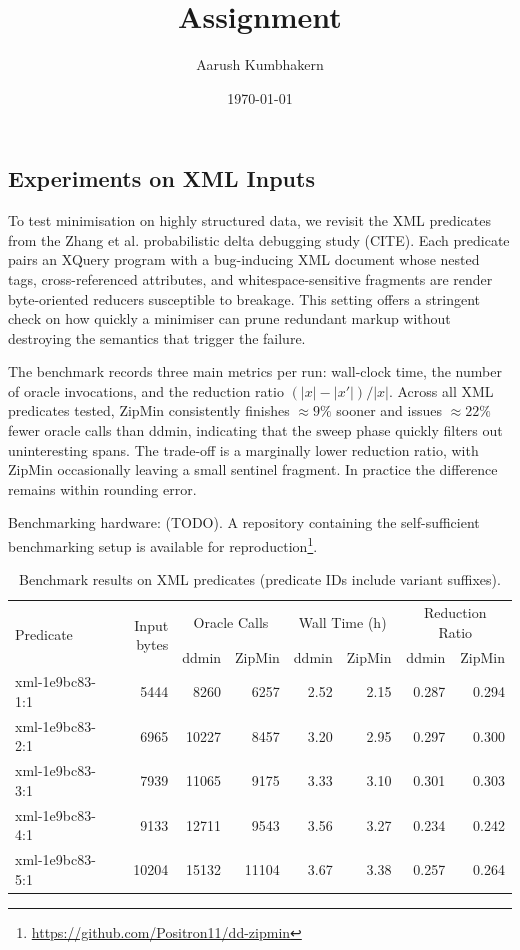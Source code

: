 \documentclass[9pt]{extarticle}
\title{Assignment}
\author{Aarush Kumbhakern}
\date{\today}
\begin{document}
\maketitle

\subsection{Experiments on XML Inputs}

To test minimisation on highly structured data, we revisit the XML predicates from the Zhang et al. probabilistic delta debugging study (CITE). Each predicate pairs an XQuery program with a bug-inducing XML document whose nested tags, cross-referenced attributes, and whitespace-sensitive fragments are render byte-oriented reducers susceptible to breakage. This setting offers a stringent check on how quickly a minimiser can prune redundant markup without destroying the semantics that trigger the failure.

The benchmark records three main metrics per run: wall-clock time, the number of oracle invocations, and the reduction ratio $(|x| - |x'|)/|x|$. Across all XML predicates tested, ZipMin consistently finishes $\approx 9\%$ sooner and issues $\approx 22\%$ fewer oracle calls than ddmin, indicating that the sweep phase quickly filters out uninteresting spans. The trade-off is a marginally lower reduction ratio, with ZipMin occasionally leaving a small sentinel fragment. In practice the difference remains within rounding error.

Benchmarking hardware: (TODO). A repository containing the self-sufficient benchmarking setup is available for reproduction\footnote{\url{https://github.com/Positron11/dd-zipmin}}.
 
\begin{table}[ht]
    \centering
    \scriptsize
    
    \caption{Benchmark results on XML predicates (predicate IDs include variant suffixes).}
    
    \begin{tabular}{l r r r r r r r}
        \hline
        \multirow{2}{*}{Predicate} & \multirow{2}{*}{Input bytes} & \multicolumn{2}{c}{Oracle Calls} & \multicolumn{2}{c}{Wall Time (h)} & \multicolumn{2}{c}{Reduction Ratio} \\
        &  & ddmin & ZipMin & ddmin & ZipMin & ddmin & ZipMin \\
        \hline
        xml-1e9bc83-1:1 & 5444 & 8260 & 6257 & 2.52 & 2.15 & 0.287 & 0.294 \\
        xml-1e9bc83-2:1 & 6965 & 10227 & 8457 & 3.20 & 2.95 & 0.297 & 0.300 \\
        xml-1e9bc83-3:1 & 7939 & 11065 & 9175 & 3.33 & 3.10 & 0.301 & 0.303 \\
        xml-1e9bc83-4:1 & 9133 & 12711 & 9543 & 3.56 & 3.27 & 0.234 & 0.242 \\
        xml-1e9bc83-5:1 & 10204 & 15132 & 11104 & 3.67 & 3.38 & 0.257 & 0.264 \\
        \hline
    \end{tabular}
    
    \label{tab:xml}
\end{table}
\end{document}
